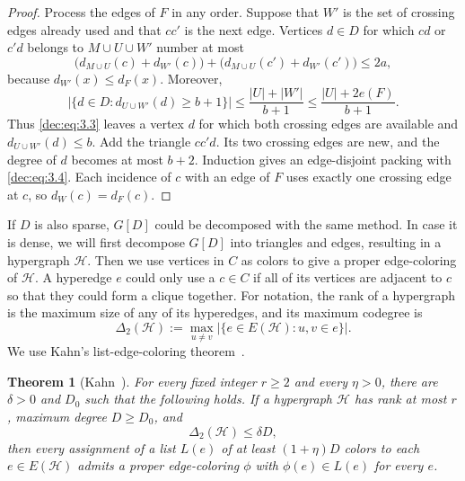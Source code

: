 \documentclass[11pt]{article}
\numberwithin{equation}{section}
\newtheorem{theorem}{Theorem}[section]
\theoremstyle{remark}
\begin{document}
\begin{proof}
Process the edges of \(F\) in any order.  Suppose that \(W'\) is the set
of crossing edges already used and that \(cc'\) is the next edge.  Vertices
\(d\in D\) for which \(cd\) or \(c'd\) belongs to
\(M\cup U\cup W'\) number at most
\begin{equation*}
 \bigl(d_{M\cup U}(c)+d_{W'}(c)\bigr)
 +\bigl(d_{M\cup U}(c')+d_{W'}(c')\bigr)\le2a,
\end{equation*}
because \(d_{W'}(x)\le d_F(x)\).  Moreover,
\begin{equation*}
 \bigl|\{d\in D:d_{U\cup W'}(d)\ge b+1\}\bigr|
 \le\frac{|U|+|W'|}{b+1}
 \le\frac{|U|+2e(F)}{b+1}.
\end{equation*}
Thus \eqref{dec:eq:3.3} leaves a vertex \(d\) for which both crossing edges are available
and \(d_{U\cup W'}(d)\le b\).  Add the triangle \(cc'd\).  Its two crossing
edges are new, and the degree of \(d\) becomes at most \(b+2\).  Induction gives an
edge-disjoint packing with \eqref{dec:eq:3.4}.  Each incidence of \(c\) with an edge
of \(F\) uses exactly one crossing edge at \(c\), so \(d_W(c)=d_F(c)\).
\end{proof}

If \(D\) is also sparse, \(G[D]\) could be decomposed with the same method. In case it is dense,
we will first decompose \(G[D]\) into triangles and edges, resulting in a hypergraph \(\mathcal H\).
Then we use vertices in \(C\) as colors to give a proper edge-coloring of \(\mathcal H\).
A hyperedge \(e\) could only use a \(c\in C\) if all of its vertices are adjacent to \(c\) so that
they could form a clique together. For notation, the rank of a hypergraph is the maximum size of any
of its hyperedges, and its maximum codegree is
\begin{equation*}
 \Delta_2(\mathcal H)
 :=\max_{u\ne v}\bigl|\{e\in E(\mathcal H):u,v\in e\}\bigr|.
\end{equation*}
We use Kahn's list-edge-coloring theorem~\cite{Kahn}. 
\begin{theorem}[Kahn~\cite{Kahn}]\label{dec:thm:Kahn}
For every fixed integer \(r\ge2\) and every \(\eta>0\), there are \(\delta>0\) and \(D_0\) such that
the following holds.  If a hypergraph \(\mathcal H\) has rank at most \(r\), maximum degree \(D\ge D_0\), and
\begin{equation*}
 \Delta_2(\mathcal H)\le\delta D,
\end{equation*}
then every assignment of a list \(L(e)\) of at least \((1+\eta)D\) colors to each \(e\in E(\mathcal H)\) admits
a proper edge-coloring \(\phi\) with \(\phi(e)\in L(e)\) for every \(e\).
\end{theorem}
\end{document}
